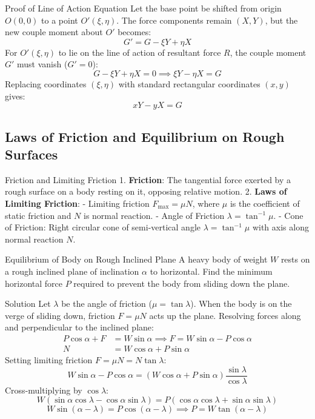 \documentclass[11pt,a4paper]{article}
\begin{document}
\begin{proofbox}{Proof of Line of Action Equation}
Let the base point be shifted from origin $O(0,0)$ to a point $O'(\xi, \eta)$.
The force components remain $(X, Y)$, but the new couple moment about $O'$ becomes:
\[
G' = G - \xi Y + \eta X
\]
For $O'(\xi, \eta)$ to lie on the line of action of resultant force $R$, the couple moment $G'$ must vanish ($G' = 0$):
\[
G - \xi Y + \eta X = 0 \implies \xi Y - \eta X = G
\]
Replacing coordinates $(\xi, \eta)$ with standard rectangular coordinates $(x, y)$ gives:
\[
xY - yX = G
\]
\end{proofbox}

\subsection{Laws of Friction and Equilibrium on Rough Surfaces}

\begin{definitionbox}{Friction and Limiting Friction}
1. \textbf{Friction}: The tangential force exerted by a rough surface on a body resting on it, opposing relative motion.
2. \textbf{Laws of Limiting Friction}:
   - Limiting friction $F_{\max} = \mu N$, where $\mu$ is the coefficient of static friction and $N$ is normal reaction.
   - Angle of Friction $\lambda = \tan^{-1}\mu$.
   - Cone of Friction: Right circular cone of semi-vertical angle $\lambda = \tan^{-1}\mu$ with axis along normal reaction $N$.
\end{definitionbox}

\begin{examplebox}{Equilibrium of Body on Rough Inclined Plane}
A heavy body of weight $W$ rests on a rough inclined plane of inclination $\alpha$ to horizontal. Find the minimum horizontal force $P$ required to prevent the body from sliding down the plane.
\end{examplebox}

\begin{proofbox}{Solution}
Let $\lambda$ be the angle of friction ($\mu = \tan\lambda$).
When the body is on the verge of sliding down, friction $F = \mu N$ acts up the plane.
Resolving forces along and perpendicular to the inclined plane:
\begin{align}
P \cos\alpha + F &= W \sin\alpha \implies F = W \sin\alpha - P \cos\alpha \\
N &= W \cos\alpha + P \sin\alpha
\end{align}
Setting limiting friction $F = \mu N = N \tan\lambda$:
\[
W \sin\alpha - P \cos\alpha = (W \cos\alpha + P \sin\alpha) \frac{\sin\lambda}{\cos\lambda}
\]
Cross-multiplying by $\cos\lambda$:
\[
W (\sin\alpha \cos\lambda - \cos\alpha \sin\lambda) = P (\cos\alpha \cos\lambda + \sin\alpha \sin\lambda)
\]
\[
W \sin(\alpha - \lambda) = P \cos(\alpha - \lambda) \implies P = W \tan(\alpha - \lambda)
\]
\end{proofbox}
\end{document}
